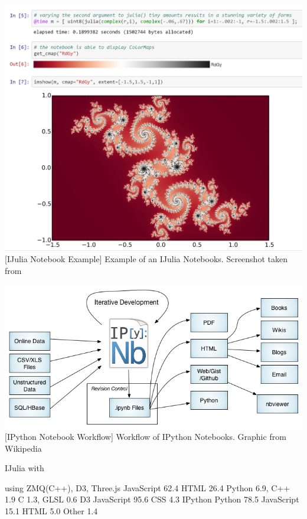 \vspace{1em}
\begin{minipage}{\linewidth}
    \centering
    \includegraphics[width=0.9\linewidth]{graphics/ijnotebook.png}
    [IJulia Notebook Example]{
    	Example of an IJulia Notebooks.
    	Screenshot taken from \cite{IJuliaNotebook}
    }
    \label{fig:ijulianotebook}
\end{minipage}

\vspace{1em}
\begin{minipage}{\linewidth}
    \centering
    \includegraphics[width=0.9\linewidth]{graphics/IPython_Notebook_Workflows.png}
    [IPython Notebook Workflow]{
    	Workflow of IPython Notebooks.
    	Graphic from Wikipedia \cite{IPyhonNotebookFlow}
    }
    \label{fig:ipythonnotebookflow}
\end{minipage}

IJulia with 

using ZMQ(C++), D3, 
Three.js
JavaScript 62.4	 HTML 26.4	 Python 6.9,	 C++ 1.9	 C 1.3,	 GLSL 0.6
D3
JavaScript 95.6	 CSS 4.3
IPython
Python 78.5	 JavaScript 15.1	 HTML 5.0	 Other 1.4


